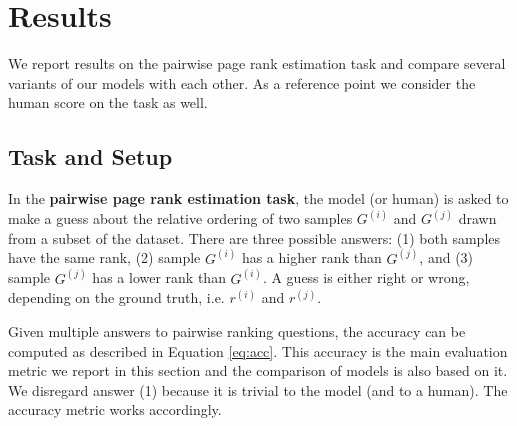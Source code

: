 \section{Results}
\label{sec:results}

We report results on the pairwise page rank estimation task and compare several variants of our models with each other. As a reference point we consider the human score on the task as well.

\subsection{Task and Setup}

In the \textbf{pairwise page rank estimation task}, the model (or human) is asked to make a guess about the relative ordering of two samples $G^{(i)}$ and $G^{(j)}$ drawn from a subset of the dataset.
There are three possible answers: (1) both samples have the same rank, (2) sample $G^{(i)}$ has a higher rank than $G^{(j)}$, and (3) sample $G^{(j)}$ has a lower rank than $G^{(i)}$. A guess is either right or wrong, depending on the ground truth, i.e. $r^{(i)}$ and $r^{(j)}$.

Given multiple answers to pairwise ranking questions, the accuracy can be computed as described in Equation \ref{eq:acc}. This accuracy is the main evaluation metric we report in this section and the comparison of models is also based on it. We disregard answer (1) because it is trivial to the model (and to a human). The accuracy metric works accordingly.

